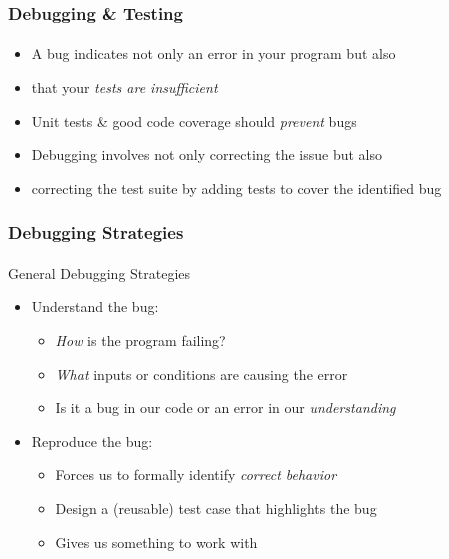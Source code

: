 \documentclass[]{beamer}
\begin{document}
\begin{frame}[fragile]
  \frametitle{Debugging \& Testing}
  \framesubtitle{}

\begin{itemize}[<+->]
  \item A bug indicates not only an error in your program but also
  \item that your \emph{tests are insufficient}
  \item Unit tests \& good code coverage should \emph{prevent} bugs 
  \item Debugging involves not only correcting the issue but also
  \item correcting the test suite by adding tests to cover the identified bug
\end{itemize}


\end{frame}

\begin{frame}
  \frametitle{Debugging Strategies}
  \framesubtitle{}

General Debugging Strategies
\begin{itemize}[<+->] 
  \item Understand the bug: 
  \begin{itemize}
    \item \emph{How} is the program failing?  
    \item \emph{What} inputs or conditions are causing the error
    \item Is it a bug in our code or an error in our \emph{understanding}
  \end{itemize}
  \item Reproduce the bug:
  \begin{itemize}
    \item Forces us to formally identify \emph{correct behavior}
    \item Design a (reusable) test case that highlights the bug
    \item Gives us something to work with
  \end{itemize}
\end{itemize}

\end{frame}
\end{document}
